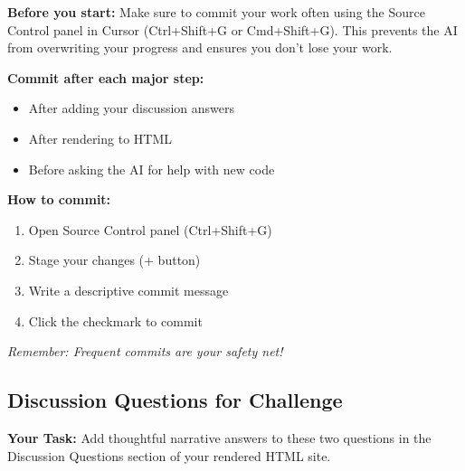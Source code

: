 \documentclass[
  letterpaper,
  DIV=11,
  numbers=noendperiod]{scrartcl}
\providecommand{\tightlist}{%
  \setlength{\itemsep}{0pt}\setlength{\parskip}{0pt}}
\begin{document}
\begin{tcolorbox}[enhanced jigsaw, colbacktitle=quarto-callout-warning-color!10!white, toptitle=1mm, colframe=quarto-callout-warning-color-frame, breakable, rightrule=.15mm, arc=.35mm, bottomtitle=1mm, titlerule=0mm, opacityback=0, title=\textcolor{quarto-callout-warning-color}{\faExclamationTriangle}\hspace{0.5em}{💾 Important: Save Your Work Frequently!}, colback=white, bottomrule=.15mm, toprule=.15mm, leftrule=.75mm, coltitle=black, opacitybacktitle=0.6, left=2mm]

\textbf{Before you start:} Make sure to commit your work often using the
Source Control panel in Cursor (Ctrl+Shift+G or Cmd+Shift+G). This
prevents the AI from overwriting your progress and ensures you don't
lose your work.

\textbf{Commit after each major step:}

\begin{itemize}
\tightlist
\item
  After adding your discussion answers
\item
  After rendering to HTML
\item
  Before asking the AI for help with new code
\end{itemize}

\textbf{How to commit:}

\begin{enumerate}
\def\labelenumi{\arabic{enumi}.}
\tightlist
\item
  Open Source Control panel (Ctrl+Shift+G)
\item
  Stage your changes (+ button)
\item
  Write a descriptive commit message
\item
  Click the checkmark to commit
\end{enumerate}

\emph{Remember: Frequent commits are your safety net!}

\end{tcolorbox}

\subsection{Discussion Questions for
Challenge}\label{discussion-questions-for-challenge}

\textbf{Your Task:} Add thoughtful narrative answers to these two
questions in the Discussion Questions section of your rendered HTML
site.
\end{document}
